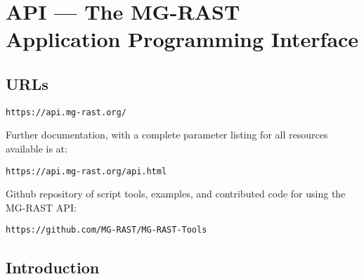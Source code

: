 \chapter{API --- The MG-RAST Application Programming Interface}
\label{API}

% 

\section{URLs}
\begin{small}
\begin{verbatim}
https://api.mg-rast.org/
\end{verbatim}
\end{small} Further documentation, with a complete parameter listing for all resources available is at:
\begin{small}
\begin{verbatim}
https://api.mg-rast.org/api.html
\end{verbatim}
\end{small} Github repository of script tools, examples, and contributed code for using the MG-RAST API:
\begin{small}
\begin{verbatim}
https://github.com/MG-RAST/MG-RAST-Tools
\end{verbatim}
\end{small}
\section{Introduction}

